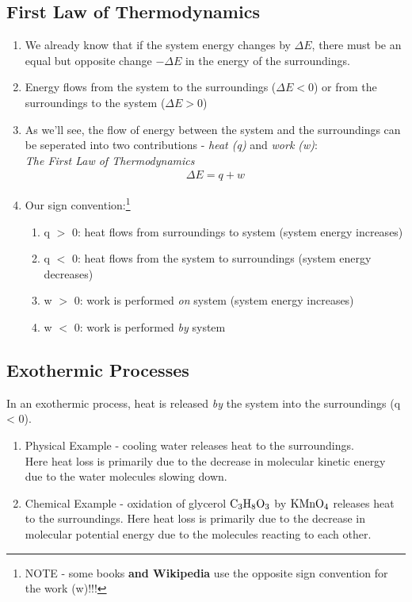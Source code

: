 \documentclass{article}  %
\begin{document}
\subsection*{First Law of Thermodynamics}
\begin{enumerate}
    \item We already know that if the system energy changes by $\Delta E$, there must be an equal but opposite change $-\Delta E$ in the energy of the surroundings.
    \item Energy flows from the system to the surroundings ($\Delta E < 0$) or from the surroundings to the system ($\Delta E > 0$)
    \item As we'll see, the flow of energy between the system and the surroundings can be seperated into two contributions - \emph{heat (q)} and \emph{work (w)}: \\
    \emph{The First Law of Thermodynamics}
        \begin{equation*}
            \begin{aligned}
                \Delta E = q + w 
            \end{aligned}
        \end{equation*}
    \item Our sign convention:\footnote{NOTE - some books \textbf{and Wikipedia} use the opposite sign convention for the work (w)!!!}
        \begin{enumerate}
            \item q $>$ 0: heat flows from surroundings to system (system energy increases) 
            \item q $<$ 0: heat flows from the system to surroundings (system energy decreases)
            \item w $>$ 0: work is performed \emph{on} system (system energy increases)
            \item w $<$ 0: work is performed \emph{by} system
        \end{enumerate}
\end{enumerate}

\subsection*{Exothermic Processes}
In an exothermic process, heat is released \emph{by} the system into the surroundings (q < 0).
\begin{enumerate}
    \item Physical Example - cooling water releases heat to the surroundings. \\
    Here heat loss is primarily due to the decrease in molecular kinetic energy due to the water molecules slowing down.
    \item Chemical Example - oxidation of glycerol $\ce{C3H8O3}$ by $\ce{KMnO4}$ releases heat to the surroundings.
    Here heat loss is primarily due to the decrease in molecular potential energy due to the molecules reacting to each other.
\end{enumerate}
\end{document}
